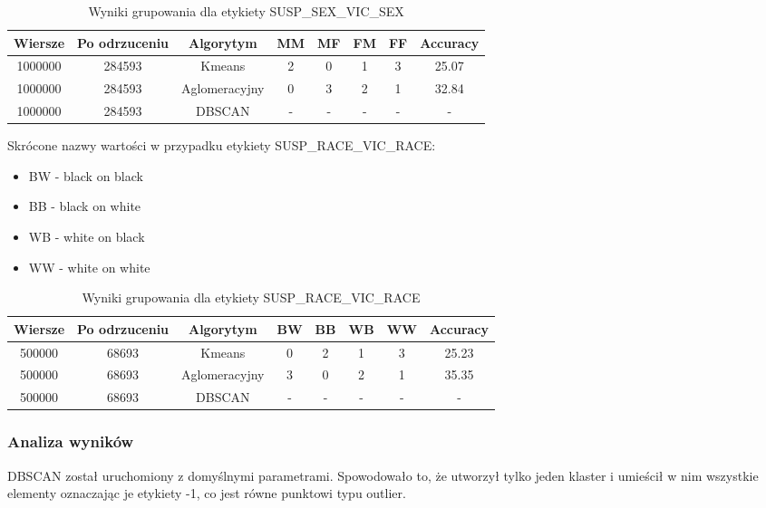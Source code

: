 \documentclass{classrep}
\begin{document}
{{            \begin{table}[!htbp]
                \begin{tabular}{|c|c|c|c|c|c|c|c|}
                    \hline
                    Wiersze & Po odrzuceniu & Algorytym & MM & MF & FM & FF & Accuracy \\ \hline
                    1000000 & 284593 & Kmeans & 2 & 0 & 1 & 3 & 25.07 \\ \hline
                    1000000 & 284593 & Aglomeracyjny & 0 & 3 & 2 & 1  & 32.84 \\ \hline
                    1000000 & 284593 & DBSCAN & - & - & - & - & - \\ \hline
                \end{tabular}
                \caption{Wyniki grupowania dla etykiety SUSP\_SEX\_VIC\_SEX}
                \label{tab:svsex}
            \end{table}
            
            Skrócone nazwy wartości w przypadku etykiety SUSP\_RACE\_VIC\_RACE:
            \begin{itemize}
                \item BW - black on black
                \item BB - black on white
                \item WB - white on black
                \item WW - white on white
            \end{itemize}
            
            \begin{table}[!htbp]
                \begin{tabular}{|c|c|c|c|c|c|c|c|}
                    \hline
                    Wiersze & Po odrzuceniu & Algorytym & BW & BB & WB & WW & Accuracy \\ \hline
                    500000 & 68693 & Kmeans & 0 & 2 & 1 & 3 & 25.23 \\ \hline
                    500000 & 68693 & Aglomeracyjny & 3 & 0 & 2 & 1  & 35.35 \\ \hline
                    500000 & 68693 & DBSCAN & - & - & - & - & - \\ \hline
                \end{tabular}
                \caption{Wyniki grupowania dla etykiety SUSP\_RACE\_VIC\_RACE}
                \label{tab:svsex}
            \end{table}
            
            \subsubsection{Analiza wyników}
            DBSCAN został uruchomiony z domyślnymi parametrami. Spowodowało to, że utworzył tylko jeden klaster i umieścił w nim wszystkie elementy oznaczając je etykiety -1, co jest równe punktowi typu outlier.
            
}}
\end{document}
